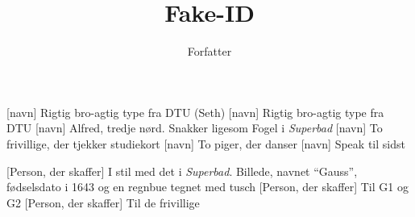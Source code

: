 \documentclass[a4paper,11pt]{article}
\title{Fake-ID}
\author{Forfatter}
\begin{document}
\maketitle

\begin{roles}
[navn] Rigtig bro-agtig type fra DTU (Seth)
[navn] Rigtig bro-agtig type fra DTU
[navn] Alfred, tredje nørd. Snakker ligesom Fogel i \emph{Superbad}
[navn] To frivillige, der tjekker studiekort
[navn] To piger, der danser
[navn] Speak til sidst
\end{roles}

\begin{props}
[Person, der skaffer] I stil med det i \emph{Superbad}. Billede, navnet ``Gauss'', fødselsdato i 1643 og en regnbue tegnet med tusch
[Person, der skaffer] Til G1 og G2
[Person, der skaffer] Til de frivillige
\end{props}
\end{document}
